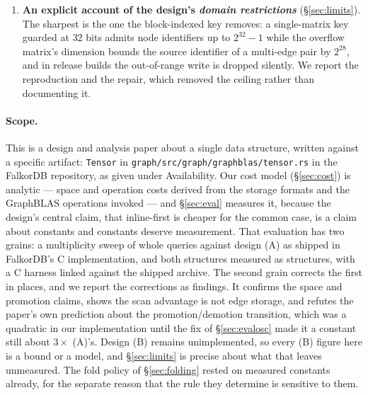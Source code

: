 \documentclass[11pt,a4paper]{article}
\theoremstyle{plain}
\theoremstyle{definition}
\theoremstyle{remark}
\begin{document}
\begin{enumerate}
        promotion/demotion transition, predicted to be a small constant, was a
        quadratic in our implementation: we give the measurement, the
        instrumented cause, the fix, and the $3\times$ residual.
  \item \textbf{An explicit account of the design's \emph{domain
        restrictions}} (\S\ref{sec:limits}). The sharpest is the one the
        block-indexed key removes: a single-matrix key guarded at $32$ bits
        admits node identifiers up to $2^{32}-1$ while the overflow matrix's
        dimension bounds the source identifier of a multi-edge pair by
        $2^{28}$, and in release builds the out-of-range write is dropped
        silently. We report the reproduction
        and the repair, which removed the ceiling rather than documenting it.
\end{enumerate}

\paragraph{Scope.} This is a design and analysis paper about a single data
structure, written against a specific artifact: \texttt{Tensor} in
\texttt{graph/src/graph/graphblas/tensor.rs} in the FalkorDB repository, as
given under Availability. Our cost model (\S\ref{sec:cost}) is
analytic --- space and operation costs derived from the storage formats and the
GraphBLAS operations invoked --- and \S\ref{sec:eval} measures it, because the
design's central claim, that inline-first is cheaper for the common case, is a
claim about constants and constants deserve measurement. That evaluation has two grains: a
multiplicity sweep of whole queries against design (A) as shipped in FalkorDB's
C implementation, and both structures measured as structures, with a C harness
linked against the shipped archive. The second grain corrects the first in
places, and we report the corrections as findings. It confirms the
space and promotion claims, shows the scan advantage is not edge storage, and
refutes the paper's own prediction about the promotion/demotion transition,
which was a quadratic in our implementation until the fix of
\S\ref{sec:evalosc} made it a constant still about $3\times$ (A)'s. Design (B)
remains unimplemented, so every (B) figure here is a bound or a model, and
\S\ref{sec:limits} is precise about what that leaves unmeasured. The fold policy of \S\ref{sec:folding} rested on measured constants
already, for the separate reason that the rule they determine is sensitive to
them.
\end{document}
